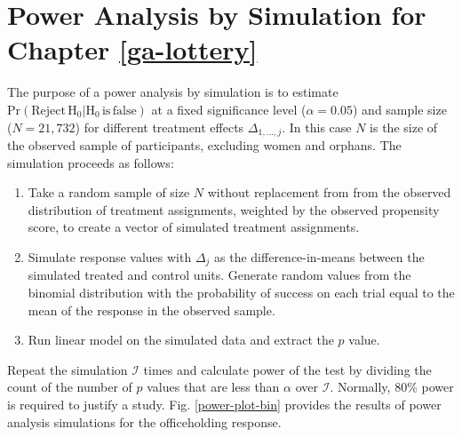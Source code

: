 \chapter{Power Analysis by Simulation for Chapter \ref{ga-lottery}}\label{oa-power}

The purpose of a power analysis by simulation is to estimate $\mathrm{Pr}(\mathrm{Reject \, H_0} | \mathrm{H_0 \, is \, false})$ at a fixed significance level ($\alpha =0.05$) and sample size ($N=21,732$) for different treatment effects $\Delta_{1, \ldots, j}$. In this case $N$ is the size of the observed sample of participants, excluding women and orphans. The simulation proceeds as follows:

\begin{enumerate}
	\item Take a random sample of size $N$ without replacement from from the observed distribution of treatment assignments, weighted by the observed propensity score, to create a vector of simulated treatment assignments.
	\item Simulate response values with $\Delta_{j}$ as the difference-in-means between the simulated treated and control units. Generate random values from the binomial distribution with the probability of success on each trial equal to the mean of the response in the observed sample.
	\item Run linear model on the simulated data and extract the $p$ value.
\end{enumerate}

Repeat the simulation $\mathcal{I}$ times and calculate power of the test by dividing the count of the number of $p$ values that are less than $\alpha$ over $\mathcal{I}$. Normally, 80\% power is required to justify a study.  Fig. \ref{power-plot-bin} provides the results of power analysis simulations for the officeholding response. 